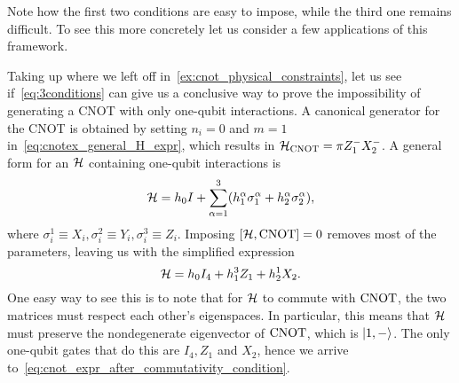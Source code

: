 Note how the first two conditions are easy to impose, while the third one remains difficult. To see this more concretely let us consider a few applications of this framework.

\begin{example}[label={ex:cnot_with_conditions}]
Taking up where we left off in~\cref{ex:cnot_physical_constraints}, let us see if~\cref{eq:3conditions} can give us a conclusive way to prove the impossibility of generating a CNOT with only one-qubit interactions.
A canonical generator for the CNOT is obtained by setting $n_i=0$ and $m=1$ in~\cref{eq:cnotex_general_H_expr}, which results in
${\mathcal{H}}_{\operatorname{CNOT}}=\pi Z_1^- X_2^-$.
A general form for an ${\mathcal{H}}$ containing one-qubit interactions is
\begin{equation}
    {\mathcal{H}} = h_0 I +
    \sum_{\alpha=1}^3 (h_1^\alpha\sigma_1^\alpha + h_2^\alpha\sigma_2^\alpha),
\end{equation}
where $\sigma_i^1\equiv X_i, \sigma_i^2\equiv Y_i, \sigma_i^3\equiv Z_i$.
Imposing $[{\mathcal{H}},\operatorname{CNOT}]=0$ removes most of the parameters, leaving us with the simplified expression
\begin{equation}
    {\mathcal{H}} = h_0 I_4 + h_1^3 Z_1 + h_2^1 X_2.
    \label{eq:cnot_expr_after_commutativity_condition}
\end{equation}
One easy way to see this is to note that for ${\mathcal{H}}$ to commute with $\operatorname{CNOT}$, the two matrices must respect each other's eigenspaces. In particular, this means that ${\mathcal{H}}$ must preserve the nondegenerate eigenvector of $\operatorname{CNOT}$, which is $\ket{1,-}$.
The only one-qubit gates that do this are $I_4, Z_1$ and $X_2$, hence we arrive to~\cref{eq:cnot_expr_after_commutativity_condition}.


\end{example}
